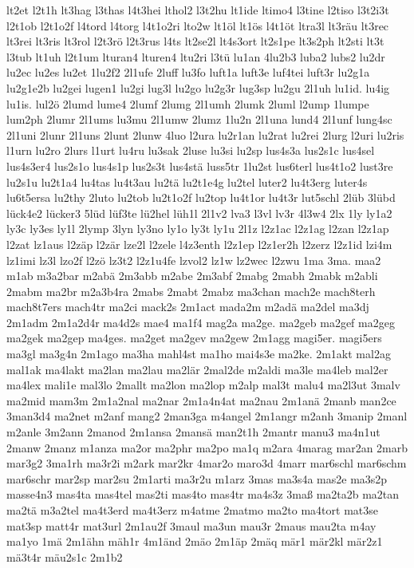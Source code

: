 {lt2et
l2t1h
lt3hag
l3thas
l4t3hei
lthol2
l3t2hu
lt1ide
ltimo4
l3tine
l2tiso
l3t2i3t
l2t1ob
l2t1o2f
l4tord
l4torg
l4t1o2ri
lto2w
lt1öl
lt1ös
l4t1öt
ltra3l
lt3räu
lt3rec
lt3rei
lt3ris
lt3rol
l2t3rö
l2t3rus
l4ts
lt2se2l
lt4s3ort
lt2s1pe
lt3s2ph
lt2sti
lt3t
l3tub
lt1uh
l2t1um
lturan4
lturen4
ltu2ri
l3tü
lu1an
4lu2b3
luba2
lubs2
lu2dr
lu2ec
lu2es
lu2et
1lu2f2
2l1ufe
2luff
lu3fo
luft1a
luft3e
luf4tei
luft3r
lu2g1a
lu2g1e2b
lu2gei
lugen1
lu2gi
lug3l
lu2go
lu2g3r
lug3sp
lu2gu
2l1uh
lu1id.
lu4ig
lu1is.
lul2ö
2lumd
lume4
2lumf
2lumg
2l1umh
2lumk
2luml
l2ump
1lumpe
lum2ph
2lumr
2l1ums
lu3mu
2l1umw
2lumz
1lu2n
2l1una
lund4
2l1unf
lung4sc
2l1uni
2lunr
2l1uns
2lunt
2lunw
4luo
l2ura
lu2r1an
lu2rat
lu2rei
2lurg
l2uri
lu2ris
l1urn
lu2ro
2lurs
l1urt
lu4ru
lu3sak
2luse
lu3si
lu2sp
lus4s3a
lus2s1c
lus4sel
lus4s3er4
lus2s1o
lus4s1p
lus2s3t
lus4stä
luss5tr
1lu2st
lus6terl
lus4t1o2
lust3re
lu2s1u
lu2t1a4
lu4tas
lu4t3au
lu2tä
lu2t1e4g
lu2tel
luter2
lu4t3erg
luter4s
lu6t5ersa
lu2thy
2luto
lu2tob
lu2t1o2f
lu2top
lu4t1or
lu4t3r
lut5schl
2lüb
3lübd
lück4e2
lücker3
5lüd
lüf3te
lü2hel
lüh1l
2l1v2
lva3
l3vl
lv3r
4l3w4
2lx
1ly
ly1a2
ly3c
ly3es
ly1l
2lymp
3lyn
ly3no
ly1o
ly3t
ly1u
2l1z
l2z1ac
l2z1ag
l2zan
l2z1ap
l2zat
lz1aus
l2zäp
l2zär
lze2l
l2zele
l4z3enth
l2z1ep
l2z1er2h
l2zerz
l2z1id
lzi4m
lz1imi
lz3l
lzo2f
l2zö
lz3t2
l2z1u4fe
lzvol2
lz1w
lz2wec
l2zwu
1ma
3ma.
maa2
m1ab
m3a2bar
m2abä
2m3abb
m2abe
2m3abf
2mabg
2mabh
2mabk
m2abli
2mabm
ma2br
m2a3b4ra
2mabs
2mabt
2mabz
ma3chan
mach2e
mach8terh
mach8t7ers
mach4tr
ma2ci
mack2s
2m1act
mada2m
m2adä
ma2del
ma3dj
2m1adm
2m1a2d4r
ma4d2s
mae4
ma1f4
mag2a
ma2ge.
ma2geb
ma2gef
ma2geg
ma2gek
ma2gep
ma4ges.
ma2get
ma2gev
ma2gew
2m1agg
magi5er.
magi5ers
ma3gl
ma3g4n
2m1ago
ma3ha
mahl4st
ma1ho
mai4s3e
ma2ke.
2m1akt
mal2ag
mal1ak
ma4lakt
ma2lan
ma2lau
ma2lär
2mal2de
m2aldi
ma3le
ma4leb
mal2er
ma4lex
mali1e
mal3lo
2mallt
ma2lon
ma2lop
m2alp
mal3t
malu4
ma2l3ut
3malv
ma2mid
mam3m
2m1a2nal
ma2nar
2m1a4n4at
ma2nau
2m1anä
2manb
man2ce
3man3d4
ma2net
m2anf
mang2
2man3ga
m4angel
2m1angr
m2anh
3manip
2manl
m2anle
3m2ann
2manod
2m1ansa
2mansä
man2t1h
2mantr
manu3
ma4n1ut
2manw
2manz
m1anza
ma2or
ma2phr
ma2po
ma1q
m2ara
4marag
mar2an
2marb
mar3g2
3ma1rh
ma3r2i
m2ark
mar2kr
4mar2o
maro3d
4marr
mar6schl
mar6schm
mar6schr
mar2sp
mar2su
2m1arti
ma3r2u
m1arz
3mas
ma3s4a
mas2e
ma3s2p
masse4n3
mas4ta
mas4tel
mas2ti
mas4to
mas4tr
ma4s3z
3maß
ma2ta2b
ma2tan
ma2tä
m3a2tel
ma4t3erd
ma4t3erz
m4atme
2matmo
ma2to
ma4tort
mat3se
mat3sp
matt4r
mat3url
2m1au2f
3maul
ma3un
mau3r
2maus
mau2ta
m4ay
ma1yo
1mä
2m1ähn
mäh1r
4m1änd
2mäo
2m1äp
2mäq
mär1
mär2kl
mär2z1
mä3t4r
mäu2s1c
2m1b2
}
